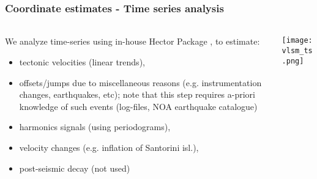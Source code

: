 \begin{frame}
  \frametitle{Coordinate estimates - Time series analysis}
  \framesubtitle{}
  \label{}
  \vskip-1cm
  \begin{columns}[T]
    \begin{column}{.4\textwidth}
      \footnotesize{
      We analyze time-series using in-house Hector Package \citep{Bos2012}, to estimate:
      \begin{itemize}
        \item tectonic velocities (linear trends),
        \item offsets/jumps due to miscellaneous reasons (e.g. instrumentation 
          changes, earthquakes, etc); note that this step requires a-priori 
          knowledge of such events (log-files, NOA earthquake catalogue)
        \item harmonics signals (using periodograms),
        \item velocity changes (e.g. inflation of Santorini isl.),
        \item post-seismic decay (not used)
      \end{itemize}}
    \end{column}
    \begin{column}{.6\textwidth}
      \begin{center}
        \texttt{[image: vlsm\_ts.png]}
      \end{center}
    \end{column}
  \end{columns}
 
\end{frame}
\note{}

%       
%      


